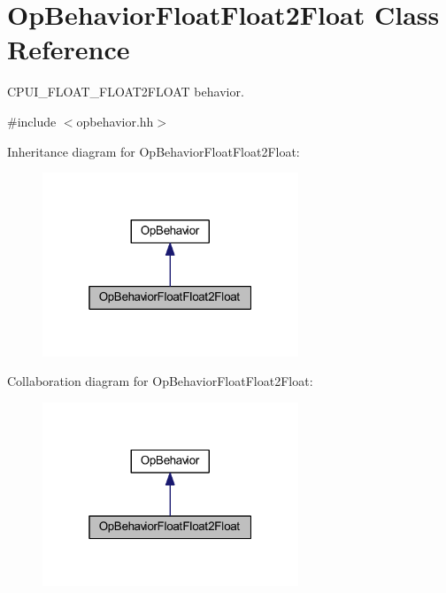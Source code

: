 \hypertarget{class_op_behavior_float_float2_float}{}\section{Op\+Behavior\+Float\+Float2\+Float Class Reference}
\label{class_op_behavior_float_float2_float}


C\+P\+U\+I\+\_\+\+F\+L\+O\+A\+T\+\_\+\+F\+L\+O\+A\+T2\+F\+L\+O\+AT behavior.  




{\ttfamily \#include $<$opbehavior.\+hh$>$}



Inheritance diagram for Op\+Behavior\+Float\+Float2\+Float\+:
\nopagebreak
\begin{figure}[H]
\begin{center}
\leavevmode
\includegraphics[width=217pt]{class_op_behavior_float_float2_float__inherit__graph}
\end{center}
\end{figure}


Collaboration diagram for Op\+Behavior\+Float\+Float2\+Float\+:
\nopagebreak
\begin{figure}[H]
\begin{center}
\leavevmode
\includegraphics[width=217pt]{class_op_behavior_float_float2_float__coll__graph}
\end{center}
\end{figure}
